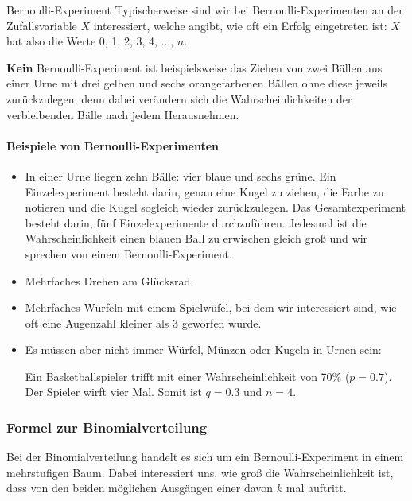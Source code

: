\begin{bemerkung}{Bernoulli-Experiment}{}
Typischerweise sind wir bei Bernoulli-Experimenten an der
Zufallsvariable $X$ interessiert, welche angibt, wie oft ein Erfolg
eingetreten ist: $X$ hat also die Werte 0, 1, 2, 3, 4, ..., $n$.
\end{bemerkung}

\textbf{Kein} Bernoulli-Experiment ist beispielsweise das Ziehen von zwei Bällen aus
einer Urne mit drei gelben und sechs orangefarbenen Bällen ohne diese
jeweils zurückzulegen; denn dabei verändern sich die
Wahrscheinlichkeiten der verbleibenden Bälle nach jedem Herausnehmen.
\newpage


\paragraph{Beispiele von Bernoulli-Experimenten}

\begin{itemize}
\item
In einer Urne liegen zehn Bälle: vier blaue und sechs grüne. Ein
Einzelexperiment besteht darin, genau eine Kugel zu ziehen, die Farbe
zu notieren und die Kugel sogleich wieder zurückzulegen.
Das Gesamtexperiment besteht darin, fünf Einzelexperimente
durchzuführen. Jedesmal ist die Wahrscheinlichkeit einen blauen Ball
zu erwischen  gleich groß und wir sprechen von einem Bernoulli-Experiment.

\item Mehrfaches Drehen am Glücksrad.

\item Mehrfaches Würfeln mit einem Spielwüfel, bei dem wir
  interessiert sind, wie oft eine Augenzahl kleiner als 3 geworfen wurde.
  
\item
Es müssen aber nicht immer Würfel, Münzen oder Kugeln in Urnen sein:

Ein Basketballspieler trifft mit einer Wahrscheinlichkeit von 70\%
($p=0.7$). Der Spieler wirft vier Mal. Somit ist $q=0.3$ und $n=4$.


\end{itemize}
\newpage


\subsubsection{Formel zur Binomialverteilung}
Bei der Binomialverteilung handelt es sich um ein
Bernoulli-Experiment
in einem mehrstufigen Baum. Dabei interessiert
uns, wie groß die Wahrscheinlichkeit ist, dass von den beiden
möglichen Ausgängen einer davon $k$ mal auftritt.

